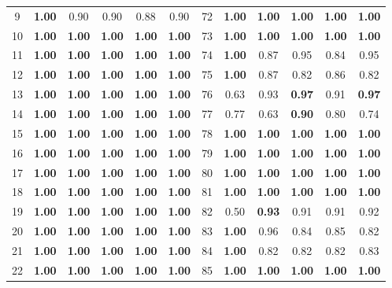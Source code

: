 \documentclass{article}
\begin{document}
{\begin{longtable}{cccccc@{\qquad}cccccc}
9 & \textbf{1.00} & 0.90 & 0.90 & 0.88 & 0.90 & 72 & \textbf{1.00} & \textbf{1.00} & \textbf{1.00} & \textbf{1.00} & \textbf{1.00} \\
10 & \textbf{1.00} & \textbf{1.00} & \textbf{1.00} & \textbf{1.00} & \textbf{1.00} & 73 & \textbf{1.00} & \textbf{1.00} & \textbf{1.00} & \textbf{1.00} & \textbf{1.00} \\
11 & \textbf{1.00} & \textbf{1.00} & \textbf{1.00} & \textbf{1.00} & \textbf{1.00} & 74 & \textbf{1.00} & 0.87 & 0.95 & 0.84 & 0.95 \\
12 & \textbf{1.00} & \textbf{1.00} & \textbf{1.00} & \textbf{1.00} & \textbf{1.00} & 75 & \textbf{1.00} & 0.87 & 0.82 & 0.86 & 0.82 \\
13 & \textbf{1.00} & \textbf{1.00} & \textbf{1.00} & \textbf{1.00} & \textbf{1.00} & 76 & 0.63 & 0.93 & \textbf{0.97} & 0.91 & \textbf{0.97} \\
14 & \textbf{1.00} & \textbf{1.00} & \textbf{1.00} & \textbf{1.00} & \textbf{1.00} & 77 & 0.77 & 0.63 & \textbf{0.90} & 0.80 & 0.74 \\
15 & \textbf{1.00} & \textbf{1.00} & \textbf{1.00} & \textbf{1.00} & \textbf{1.00} & 78 & \textbf{1.00} & \textbf{1.00} & \textbf{1.00} & \textbf{1.00} & \textbf{1.00} \\
16 & \textbf{1.00} & \textbf{1.00} & \textbf{1.00} & \textbf{1.00} & \textbf{1.00} & 79 & \textbf{1.00} & \textbf{1.00} & \textbf{1.00} & \textbf{1.00} & \textbf{1.00} \\
17 & \textbf{1.00} & \textbf{1.00} & \textbf{1.00} & \textbf{1.00} & \textbf{1.00} & 80 & \textbf{1.00} & \textbf{1.00} & \textbf{1.00} & \textbf{1.00} & \textbf{1.00} \\
18 & \textbf{1.00} & \textbf{1.00} & \textbf{1.00} & \textbf{1.00} & \textbf{1.00} & 81 & \textbf{1.00} & \textbf{1.00} & \textbf{1.00} & \textbf{1.00} & \textbf{1.00} \\
19 & \textbf{1.00} & \textbf{1.00} & \textbf{1.00} & \textbf{1.00} & \textbf{1.00} & 82 & 0.50 & \textbf{0.93} & 0.91 & 0.91 & 0.92 \\
20 & \textbf{1.00} & \textbf{1.00} & \textbf{1.00} & \textbf{1.00} & \textbf{1.00} & 83 & \textbf{1.00} & 0.96 & 0.84 & 0.85 & 0.82 \\
21 & \textbf{1.00} & \textbf{1.00} & \textbf{1.00} & \textbf{1.00} & \textbf{1.00} & 84 & \textbf{1.00} & 0.82 & 0.82 & 0.82 & 0.83 \\
22 & \textbf{1.00} & \textbf{1.00} & \textbf{1.00} & \textbf{1.00} & \textbf{1.00} & 85 & \textbf{1.00} & \textbf{1.00} & \textbf{1.00} & \textbf{1.00} & \textbf{1.00} \\

\end{longtable}}
\end{document}

